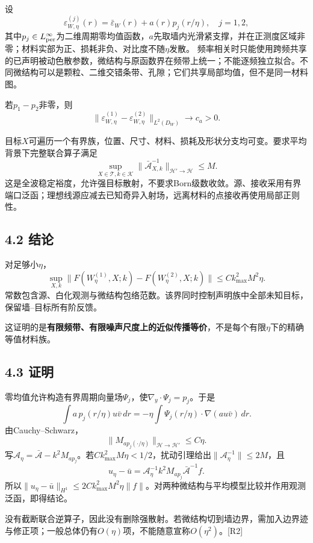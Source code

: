 \documentclass[
  10pt,
  a4paper,
]{article}
\begin{document}
设 \[
\varepsilon_{W,\eta}^{(j)}(r)=\bar\varepsilon_W(r)+a(r)p_j(r/\eta),\quad j=1,2,
\]
其中\(p_j\in L^\infty_{\rm per}\)为二维周期零均值函数，\(a\)先取墙内光滑紧支撑，并在正测度区域非零；材料实部为正、损耗非负、对比度不随\(\eta\)发散。
频率相关时只能使用跨频共享的已声明被动色散参数，微结构与原函数界在频带上统一；不能逐频独立拟合。不同微结构可以是颗粒、二维交错条带、孔隙；它们共享局部均值，但不是同一材料图。

若\(p_1-p_2\)非零，则 \[
\|\varepsilon_{W,\eta}^{(1)}-\varepsilon_{W,\eta}^{(2)}\|_{L^2(D_W)}
\longrightarrow c_a>0.
\]

目标\(X\)可遍历一个有界族，位置、尺寸、材料、损耗及形状分支均可变。要求平均背景下完整联合算子满足
\[
\sup_{X\in\mathcal T,k\in\mathcal K}
\|\bar{\mathcal A}_{X,k}^{-1}\|_{\mathcal H\prime\to\mathcal H}\le M.
\]
这是全波稳定裕度，允许强目标散射，不要求Born级数收敛。源、接收采用有界端口泛函；理想线源应减去已知奇异入射场，远离材料的点接收再使用局部正则性。

\hypertarget{ux7ed3ux8bba}{%
\subsection{4.2 结论}\label{ux7ed3ux8bba}}

对足够小\(\eta\)， \[
\boxed{
\sup_{X,k}\|F(W_\eta^{(1)},X;k)-F(W_\eta^{(2)},X;k)\|
\le C k_{\max}^2M^2\eta .
}
\]
常数包含源、白化观测与微结构包络范数。该界同时控制声明族中全部未知目标，保留墙--目标所有阶反馈。

这证明的是\textbf{有限频带、有限噪声尺度上的近似传播等价}，不是每个有限\(\eta\)下的精确等值材料族。

\hypertarget{ux8bc1ux660e}{%
\subsection{4.3 证明}\label{ux8bc1ux660e}}

零均值允许构造有界周期向量场\(\Psi_j\)，使\(\nabla_y\cdot\Psi_j=p_j\)。于是
\[
\int a\,p_j(r/\eta)u\bar v\,dr
=-\eta\int\Psi_j(r/\eta)\cdot\nabla(a u\bar v)\,dr .
\] 由Cauchy--Schwarz， \[
\|M_{a p_j(\cdot/\eta)}\|_{\mathcal H\to\mathcal H\prime}\le C\eta.
\]
写\(\mathcal A_\eta=\bar{\mathcal A}-k^2M_{ap_j}\)。若\(Ck_{\max}^2M\eta<1/2\)，扰动引理给出\(\|\mathcal A_\eta^{-1}\|\le2M\)，且
\[
u_\eta-\bar u
=\mathcal A_\eta^{-1}k^2M_{ap_j}\bar{\mathcal A}^{-1}f.
\]
所以\(\|u_\eta-\bar u\|_{H^1}\le2Ck_{\max}^2M^2\eta\|f\|\)。对两种微结构与平均模型比较并作用观测泛函，即得结论。

没有截断联合逆算子，因此没有删除强散射。若微结构切到墙边界，需加入边界迹与修正项；一般总体仍有\(O(\eta)\)项，不能随意宣称\(O(\eta^2)\)。{[}R2{]}
\end{document}

